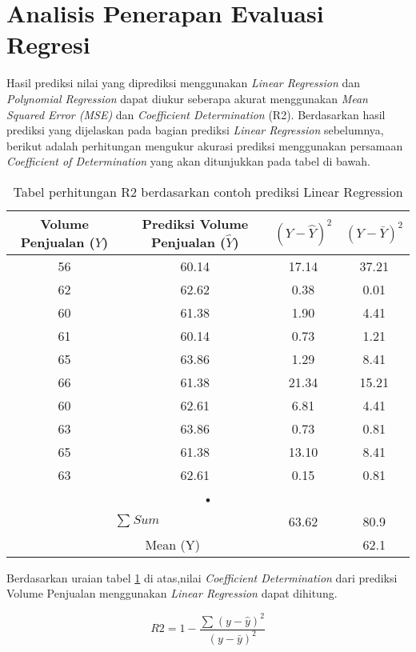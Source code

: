 \section{Analisis Penerapan Evaluasi Regresi}
Hasil prediksi nilai yang diprediksi menggunakan \textit{Linear Regression} dan \textit{Polynomial Regression} dapat diukur seberapa akurat menggunakan \textit{Mean Squared Error (MSE)} dan \textit{Coefficient Determination} (R2). Berdasarkan hasil prediksi yang dijelaskan pada bagian prediksi \textit{Linear Regression} sebelumnya, berikut adalah perhitungan mengukur akurasi prediksi menggunakan persamaan \textit{Coefficient of Determination} yang akan ditunjukkan pada tabel di bawah.


\begin{table}[H]
\caption{Tabel perhitungan R2 berdasarkan contoh prediksi Linear Regression}
\centering
\begin{tabular}{|c|c|c|c|}
\hline 
Volume Penjualan ($Y$) & Prediksi Volume Penjualan ($\hat{Y}$) & $(Y-\hat{Y})^2$ & $(Y-\bar{Y})^2$ \\ 
\hline 
56 & 60.14 & 17.14 & 37.21 \\ 
\hline 
62 & 62.62 & 0.38 & 0.01 \\ 
\hline 
60 & 61.38 & 1.90 & 4.41 \\ 
\hline 
61 & 60.14 & 0.73 & 1.21 \\ 
\hline 
65 & 63.86 & 1.29 & 8.41 \\ 
\hline 
66 & 61.38 & 21.34 & 15.21 \\ 
\hline 
60 & 62.61 & 6.81 & 4.41 \\ 
\hline 
63 & 63.86 & 0.73 & 0.81 \\ 
\hline 
65 & 61.38 & 13.10 & 8.41 \\ 
\hline 
63 & 62.61 & 0.15 & 0.81 \\ 
\hline 
\multicolumn{4}{|c|}{•} \\ 
\hline 
\multicolumn{2}{|c|}{$\sum{}^{} Sum$} & 63.62 & 80.9 \\ 
\hline 
\multicolumn{3}{|c|}{Mean (Y)} & 62.1 \\ 
\hline 
\end{tabular} 
\label{tab:TabelPerhitunganR2}
\end{table}

Berdasarkan uraian tabel \ref{tab:TabelPerhitunganR2} di atas,nilai \textit{Coefficient Determination} dari prediksi Volume Penjualan menggunakan \textit{Linear Regression} dapat dihitung.

\begin{equation}
R2 = 1 - \frac{\sum{}^{}(y-\hat{y})^2}{ (y-\bar{y})^2}
\end{equation}


